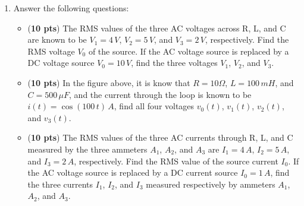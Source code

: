\begin{enumerate}

\item Answer the following questions:
  \begin{itemize}
  \item ({\bf 10 pts})
    The RMS values of the three AC voltages across R, L, and C are 
    known to be $V_1=4\,V$, $V_2=5\,V$, and $V_3=2\,V$, respectively. 
    Find the RMS voltage $V_0$ of the source. If the AC voltage source 
    is replaced by a DC voltage source $V_0=10\,V$, find the three 
    voltages $V_1$, $V_2$, and $V_3$.


  \item ({\bf 10 pts})
    In the figure above, it is know that $R=10\Omega$, $L=100\,mH$,
    and $C=500\,\mu F$, and the current through the loop is known to be
    $i(t)=\cos(100\,t)\,A$, find all four voltages $v_0(t)$, $v_1(t)$, 
    $v_2(t)$, and $v_3(t)$.

    \begin{comment}
    {\bf Solution:} 
    $V_0=5$. $V_1=V_2=0$, $V_3=10$.

    \[
    \left\{\begin{array}{lll}
    v_1(t)=R i(t)=10\cos(100\,t)\\
    v_2(t)=Z_L i(t)=j\omega L i(t)=100\times 0.1 \cos(100\,t+\pi/2)=10\cos(100\,t+\pi/2)\\
    v_3(t)=Z_C i(t)=1/(j\omega C) i(t)=1/(100\times 500\times 10^{-6})\cos(100\,t)=20\cos(100,\,t-\pi/2)
    \end{array}\right.
    \]
    \[
    V_0=V_1+V_2+V_3=10+10\angle\pi/2+20\angle(-\pi/2)=10+10\angle(-\pi/2)
    \]
    \[
    v_0(t)=10\sqrt{2}\cos(100t-\pi/4)
    \]
    \end{comment}

  \item ({\bf 10 pts})
    The RMS values of the three AC currents through R, L, and C measured 
    by the three ammeters $A_1$, $A_2$, and $A_3$ are $I_1=4\,A$, $I_2=5\,A$, 
    and $I_3=2\,A$, respectively. Find the RMS value of the source current 
    $I_0$. If the AC voltage source is replaced by a DC current source 
    $I_0=1\,A$, find the three currents $I_1$, $I_2$, and $I_3$ measured 
    respectively by ammeters $A_1$, $A_2$, and $A_3$.


    \begin{comment}
    {\bf Solution:} $I_0=5$. $I_2=1$, $I_1=I_3=0$.
    \end{comment}
    


\end{itemize}
\end{enumerate}
